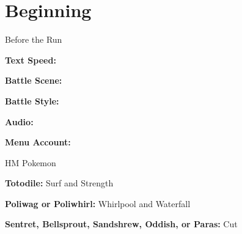 \newpage
\chapter{Beginning}
\vspace{0.5mm}

\begin{menu}[hbox]{Before the Run}
	\varwb
	\begin{optionMenu}
		\item {} \textbf{Text Speed:} \textSpeed{} \menuHlTwo{\textbf{(\pointLeft)}}
		\item {} \textbf{Battle Scene:} \battleScene{} \menuHlTwo{\textbf{(\pointLeft)}}
		\item {} \textbf{Battle Style:} \battleStyle{} \menuHlTwo{\textbf{(\pointLeft)}}
		\item {} \textbf{Audio:} \audio{} \menuHlTwo{\textbf{(\pointLeft)}}
		\item {} \textbf{Menu Account:} \menuAccount{} \menuHlTwo{\textbf{(\pointLeft)}}
	\end{optionMenu}
	\varwe
\end{menu}

\begin{misc}[hbox]{HM Pokemon}
	\varwb
	\begin{notes}
		\item \textbf{Totodile:} Surf and Strength
		\item \textbf{Poliwag or Poliwhirl:} Whirlpool and Waterfall
		\item \textbf{Sentret, Bellsprout, Sandshrew, Oddish, or Paras:} Cut
	\end{notes}
	\varwe
\end{misc}

\vspace{3.5mm}